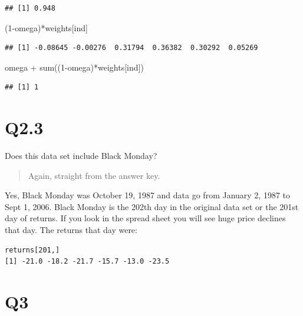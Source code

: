 \documentclass[
  oneside]{book}
\newenvironment{Shaded}{\begin{snugshade}}{\end{snugshade}}
\newcommand{\DecValTok}[1]{\textcolor[rgb]{0.00,0.00,0.81}{#1}}
\newcommand{\FunctionTok}[1]{\textcolor[rgb]{0.00,0.00,0.00}{#1}}
\newcommand{\NormalTok}[1]{#1}
\newcommand{\SpecialCharTok}[1]{\textcolor[rgb]{0.00,0.00,0.00}{#1}}
\begin{document}
\begin{verbatim}
## [1] 0.948
\end{verbatim}

\begin{Shaded}
\begin{Highlighting}[]
\NormalTok{(}\DecValTok{1}\SpecialCharTok{{-}}\NormalTok{omega)}\SpecialCharTok{*}\NormalTok{weights[ind]}
\end{Highlighting}
\end{Shaded}

\begin{verbatim}
## [1] -0.08645 -0.00276  0.31794  0.36382  0.30292  0.05269
\end{verbatim}

\begin{Shaded}
\begin{Highlighting}[]
\NormalTok{omega }\SpecialCharTok{+} \FunctionTok{sum}\NormalTok{((}\DecValTok{1}\SpecialCharTok{{-}}\NormalTok{omega)}\SpecialCharTok{*}\NormalTok{weights[ind])}
\end{Highlighting}
\end{Shaded}

\begin{verbatim}
## [1] 1
\end{verbatim}

\hypertarget{q2.3}{%
\section{Q2.3}\label{q2.3}}

Does this data set include Black Monday?

\begin{quote}
Again, straight from the answer key.
\end{quote}

Yes, Black Monday was October 19, 1987 and data go from January 2, 1987 to
Sept 1, 2006. Black Monday is the 202th day in the original data set or the
201st day of returns.
If you look in the spread sheet you will see huge price declines that day. The
returns that day were:

\begin{verbatim}
returns[201,]
[1] -21.0 -18.2 -21.7 -15.7 -13.0 -23.5
\end{verbatim}

\hypertarget{q3-3}{%
\section{Q3}\label{q3-3}}
\end{document}
